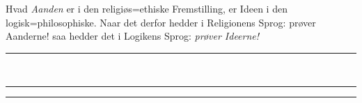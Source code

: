 \documentclass[12pt]{book}
\newcommand{\deel}[2]{%
  \par\vspace{1.2\baselineskip}%
  \noindent\rule{\linewidth}{1.2pt}\par\vspace{2pt}%
  \noindent\rule{\linewidth}{0.4pt}\par\vspace{0.9\baselineskip}%
  \begin{center}
    {\large\bfseries Den propædeutiske Logiks\par}\vspace{0.35\baselineskip}
    {\bfseries #1\par}\vspace{0.35\baselineskip}
    {\Large\bfseries\emph{#2}\par}
  \end{center}
  \vspace{0.45\baselineskip}
  \begin{center}\rule{0.20\linewidth}{0.4pt}\end{center}
  \vspace{0.45\baselineskip}
  \phantomsection
  \addcontentsline{toc}{section}{\texorpdfstring{#1\quad #2}{#1 #2}}%
  \markboth{#1\ #2}{#1\ #2}%
}
\newcommand{\divrule}{\begin{center}%
  \rule{0.27\linewidth}{0.9pt}\\[1.6pt]\rule{0.22\linewidth}{0.4pt}\end{center}}
\newcommand{\secrule}{\begin{center}%
  \rule{0.20\linewidth}{0.4pt}\\[1.3pt]\rule{0.20\linewidth}{0.4pt}\end{center}}
\begin{document}
Hvad \emph{Aanden} er i den religiøs=ethiske Fremstilling, er Ideen i den
logisk=philosophiske. Naar det derfor hedder i Religionens Sprog: prøver Aanderne! saa
hedder det i Logikens Sprog: \emph{prøver Ideerne!}

\divrule

\begin{center}\rule{0.35\linewidth}{0.4pt}\end{center}

\cleardoublepage
\end{document}
